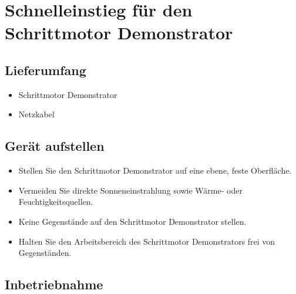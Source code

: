 \documentclass[12pt,a4paper]{scrbook}
\begin{document}
	
	\chapter{Schnelleinstieg für den Schrittmotor Demonstrator}
	
	\section{Lieferumfang}
	
	\begin{itemize}
		\item Schrittmotor Demonstrator
		\item Netzkabel
	\end{itemize}
	
	\section{Gerät aufstellen}
	\begin{itemize}
		\item Stellen Sie den Schrittmotor Demonstrator auf eine ebene, feste Oberfläche.
		\item Vermeiden Sie direkte Sonneneinstrahlung sowie Wärme- oder Feuchtigkeitsquellen.
		\item Keine Gegenstände auf den Schrittmotor Demonstrator stellen.
		\item Halten Sie den Arbeitsbereich des Schrittmotor Demonstrators frei von Gegenständen.
	\end{itemize}
	
	\section{Inbetriebnahme}
	
\end{document}
